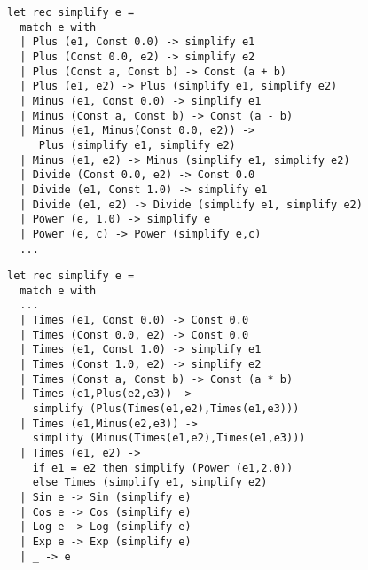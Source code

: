 \documentclass[rgb]{beamer}
\begin{document}
\begin{frame}[fragile]
\begin{footnotesize}


  \vspace{1ex}

\begin{lstlisting}[numbers=none,frame=none,mathescape]
let rec simplify e =
  match e with
  | Plus (e1, Const 0.0) -> simplify e1
  | Plus (Const 0.0, e2) -> simplify e2
  | Plus (Const a, Const b) -> Const (a + b)
  | Plus (e1, e2) -> Plus (simplify e1, simplify e2)
  | Minus (e1, Const 0.0) -> simplify e1
  | Minus (Const a, Const b) -> Const (a - b)
  | Minus (e1, Minus(Const 0.0, e2)) ->
     Plus (simplify e1, simplify e2)
  | Minus (e1, e2) -> Minus (simplify e1, simplify e2)
  | Divide (Const 0.0, e2) -> Const 0.0
  | Divide (e1, Const 1.0) -> simplify e1
  | Divide (e1, e2) -> Divide (simplify e1, simplify e2)
  | Power (e, 1.0) -> simplify e
  | Power (e, c) -> Power (simplify e,c)
  ...
\end{lstlisting}

\end{footnotesize}
\end{frame}

\begin{frame}[fragile]
\begin{footnotesize}


  \vspace{1ex}

\begin{lstlisting}[numbers=none,frame=none,mathescape]
let rec simplify e =
  match e with
  ...
  | Times (e1, Const 0.0) -> Const 0.0
  | Times (Const 0.0, e2) -> Const 0.0
  | Times (e1, Const 1.0) -> simplify e1
  | Times (Const 1.0, e2) -> simplify e2
  | Times (Const a, Const b) -> Const (a * b)
  | Times (e1,Plus(e2,e3)) ->
    simplify (Plus(Times(e1,e2),Times(e1,e3)))
  | Times (e1,Minus(e2,e3)) ->
    simplify (Minus(Times(e1,e2),Times(e1,e3)))
  | Times (e1, e2) ->
    if e1 = e2 then simplify (Power (e1,2.0))
    else Times (simplify e1, simplify e2)
  | Sin e -> Sin (simplify e)
  | Cos e -> Cos (simplify e)
  | Log e -> Log (simplify e)
  | Exp e -> Exp (simplify e)
  | _ -> e
\end{lstlisting}

\end{footnotesize}
\end{frame}
\end{document}
